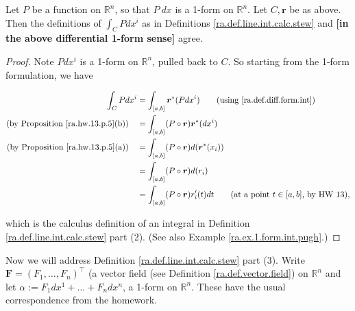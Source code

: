 \begin{proposition}

Let \(P\) be a function on \(\mathbb{R}^n\), so that \(P \ dx\) is a 1-form on \(\mathbb{R}^n\). Let \(C, \boldsymbol{r}\) be as above. Then the definitions of \(\int_C P dx^i \) as in Definitions \ref{ra.def.line.int.calc.stew} and \textbf{[in the above differential 1-form sense]} agree.

\end{proposition}

\begin{proof}



Note \(Pdx^i\) is a 1-form on \(\mathbb{R}^n\), pulled back to \(C\). So starting from the 1-form formulation, we have




\begin{align*}
\int_C P dx^i & = \int_{[a,b]} \boldsymbol{r}^* (P dx^i)  \qquad \text{(using \eqref{ra.def.diff.form.int})}
\\  \text{(by Proposition \ref{ra.hw.13.p.5}(b))} \quad & = \int_{[a,b]} (P \circ \boldsymbol{r}) \boldsymbol{r}^* ( dx^i)  
\\ \text{(by Proposition \ref{ra.hw.13.p.5}(a))} \quad  & = \int_{[a,b]} (P \circ \boldsymbol{r}) d(\boldsymbol{r}^*(x_i)) 
\\ & = \int_{[a,b]} (P \circ \boldsymbol{r}) d(r_i) 
\\ & = \int_{[a,b]} (P \circ \boldsymbol{r}) r_i'(t)dt \qquad \text{(at a point \(t \in [a,b]\), by HW 13)},
\end{align*}

which is the calculus definition of an integral in Definition \ref{ra.def.line.int.calc.stew} part (2). (See also Example \ref{ra.ex.1.form.int.pugh}.)



\end{proof}

Now we will address Definition \ref{ra.def.line.int.calc.stew} part (3). Write \(\boldsymbol{F} = (F_1, \ldots, F_n)^\top\) (a vector field (see Definition \ref{ra.def.vector.field}) on \(\mathbb{R}^n\) and let \(\alpha := F_1 dx^1 + \ldots + F_n dx^n\), a 1-form on \(\mathbb{R}^n\). These have the usual correspondence from the homework. 

